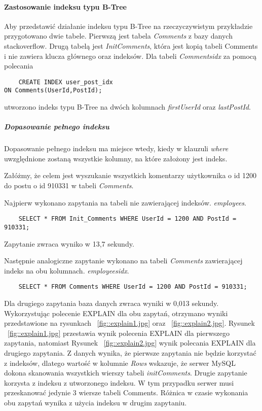\paragraph{Zastosowanie indeksu typu B-Tree}\mbox{}

Aby przedstawić działanie indeksu typu B-Tree na rzeczyczywistym przykładzie przygotowano dwie tabele. Pierwszą jest tabela \textit{Comments} z bazy danych stackoverflow. Drugą tabelą jest \textit{Init\textunderscore Comments}, która jest kopią tabeli Comments i nie zawiera klucza głównego oraz indeksów.
Dla tabeli \textit{Comments\textunderscore idx} za pomocą polecania \begin{verbatim}
    CREATE INDEX user_post_idx 
ON Comments(UserId,PostId);
\end{verbatim}
utworzono indeks typu B-Tree na dwóch kolumnach \textit{first\textunderscore UserId} oraz \textit{last\textunderscore PostId}.

\subparagraph{Dopasowanie pełnego indeksu}\mbox{}
Dopasowanie pełnego indeksu ma miejsce wtedy, kiedy w klauzuli \textit{where} uwzględnione zostaną wszystkie kolumny, na które założony jest indeks. 

Załóżmy, że celem jest wyszukanie wszystkich komentarzy użytkownika o id 1200 do postu o id 910331 w tabeli \textit{Comments}.

Najpierw wykonano zapytania na tabeli nie zawierającej indeksów.
 \textit{employees}. 
\begin{verbatim}
    SELECT * FROM Init_Comments WHERE UserId = 1200 AND PostId = 910331;
\end{verbatim}
Zapytanie zwraca wyniko w 13,7 sekundy.

Następnie analogiczne zapytanie wykonano na tabeli \textit{Comments} zawierającej indeks na obu kolumnach.
\textit{employees\textunderscore idx}. 
\begin{verbatim}
    SELECT * FROM Comments WHERE UserId = 1200 AND PostId = 910331;
\end{verbatim}
Dla drugiego zapytania baza danych zwraca wyniki w 0,013 sekundy. Wykorzystując polecenie EXPLAIN dla obu zapytań, otrzymano wyniki przedstawione na rysunkach ~\ref{fig::explain1.jpg} oraz ~\ref{fig::explain2.jpg}. Rysunek ~\ref{fig::explain1.jpg} przestawia wynik polecenia EXPLAIN dla pierwszego zapytania, natomiast Rysunek ~\ref{fig::explain2.jpg} wynik polecania EXPLAIN dla drugiego zapytania. Z danych wynika, że pierwsze zapytania nie będzie korzystać z indeksów, dlatego wartość w kolumnie \textit{Rows} wskazuje, że serwer MySQL dokona skanowania wszystkich wierszy tabeli \textit{init\textunderscore Comments}. Drugie zapytanie korzysta z indeksu z utworzonego indeksu. W tym przypadku serwer musi przeskanować jedynie 3 wiersze tabeli Comments. Różnica w czasie wykonania obu zapytań wynika z użycia indeksu w drugim zapytaniu.

